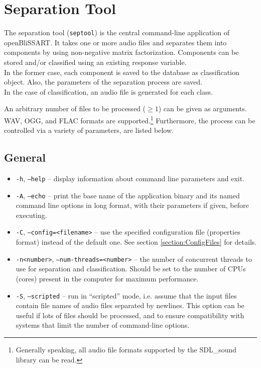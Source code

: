 \section{Separation Tool}
\label{section:septool}

The separation tool (\verb!septool!) is the central command-line application of
openBliSSART. It takes one or more audio files and separates
them into components by using non-negative matrix factorization.  Components can
be stored and/or classified using an existing response variable.\\
In the former case, each component is saved to the database as classification
object. Also, the parameters of the separation process are saved.\\
In the case of classification, an audio file is generated for each class.

An arbitrary number of files to be processed ($\geq 1$) can be given as
arguments. WAV, OGG, and FLAC formats are supported.\footnote{Generally speaking, all
  audio file formats supported by the SDL\_sound library can be read.}
Furthermore, the process can be controlled via a variety of parameters,
are listed below.

\subsection{General}

\begin{itemize}
  \item {\tt -h}, {\tt --help} -- display information about command line
    parameters and exit.
  \item {\tt -A}, {\tt --echo} -- print the base name of the application binary
    and its named command line options in long format, with their parameters if 
    given, before executing.
  \item {\tt -C}, {\tt --config=<filename>} -- use the specified configuration
    file (properties format) instead of the default one. See section 
    \ref{section:ConfigFiles} for details.
  \item {\tt -n<number>}, {\tt --num-threads=<number>} -- the number of
    concurrent threads to use for separation and classification. Should be set
    to the number of CPUs (cores) present in the computer for maximum
    performance.
  \item {\tt -S}, {\tt --scripted} -- run in ``scripted'' mode, i.e. assume that
    the input files contain file names of audio files separated by
    newlines. This option can be useful if lots of files should be processed,
    and to ensure compatibility with systems that limit the number of
    command-line options.
\end{itemize}

